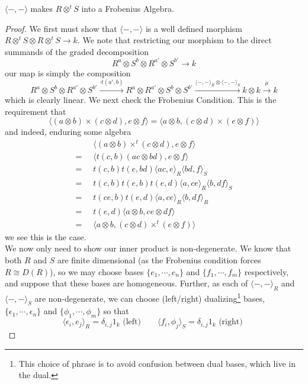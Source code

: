 \documentclass[10pt,a4paper]{amsart}
\begin{document}
\begin{proposition} $\langle-,- \rangle$ makes $R \otimes^t S$ into a Frobenius Algebra. \end{proposition}

\begin{proof} We first must show that $ \langle-,- \rangle$ is a well defined morphism $R \otimes^t S \otimes R \otimes^t S \rightarrow k$. We note that restricting our morphism to the direct summands of the graded decomposition
$$R^{a} \otimes S^{b} \otimes R^{a'} \otimes S^{b'} \rightarrow k$$
our map is simply the composition
$$R^{a} \otimes S^{b} \otimes R^{a'} \otimes S^{b'} \xrightarrow{\cdot t(a',b)} R^{a} \otimes R^{a'} \otimes S^{b} \otimes S^{b'} \xrightarrow{\langle-,-\rangle_R \otimes\langle -,- \rangle_S} k\otimes k \xrightarrow{\mu} k$$
which is clearly linear. 
We next check the Frobenius Condition. This is the requirement that
$$ \langle (a \otimes b) \times (c\otimes d), e \otimes f \rangle = \langle a \otimes b, (c \otimes d) \times (e \otimes f)\rangle $$
and indeed, enduring some algebra
\begin{align*}&\langle ( a \otimes b ) \times^t (c \otimes d ), e \otimes f\rangle\\
= \;\;&\langle t(c,b)(ac \otimes bd), e\otimes f\rangle \\
=\;\;&t(c,b)t(e,bd)\langle ac, e \rangle_R \langle bd, f \rangle_S\\
=\;\;&t(c,b)t(e,b)t(e,d)\langle a, ce\rangle_R \langle b, df \rangle_S \\
= \;\;&t(ce,b)t(e,d)\langle a, ce \rangle_R \langle b, df \rangle_R \\
=\;\; & t(e,d) \langle a \otimes b, ce \otimes df\rangle \\
=\;\; & \langle a \otimes b, (c \otimes d) \times^t (e \otimes f)\rangle
\end{align*}
we see this is the case. \\[5pt]
We now only need to show our inner product is non-degenerate.
We know that both $R$ and $S$ are finite dimensional (as the Frobenius condition forces $R \cong D(R)$), so we may choose bases $\{ e_1,\cdots, e_n\}$ and $\{f_1, \cdots, f_m\}$ respectively, and suppose that these bases are homogeneous. Further, as each of $\langle -,- \rangle_R$ and $\langle -,- \rangle_S$ are non-degenerate, we can choose (left/right) dualizing\footnote{This choice of phrase is to avoid confusion between dual bases, which live in the dual.} bases, $\{\epsilon_1, \cdots, \epsilon_n\}$ and $\{ \phi_1, \cdots, \phi_m\}$ so that
$$\langle \epsilon_i, e_j \rangle_R = \delta_{i,j}1_k \textrm{ (left) } \hspace{20pt} \langle f_i, \phi_j \rangle_S = \delta_{i,j}1_k \textrm{ (right) }$$

\end{proof}
\end{document}
